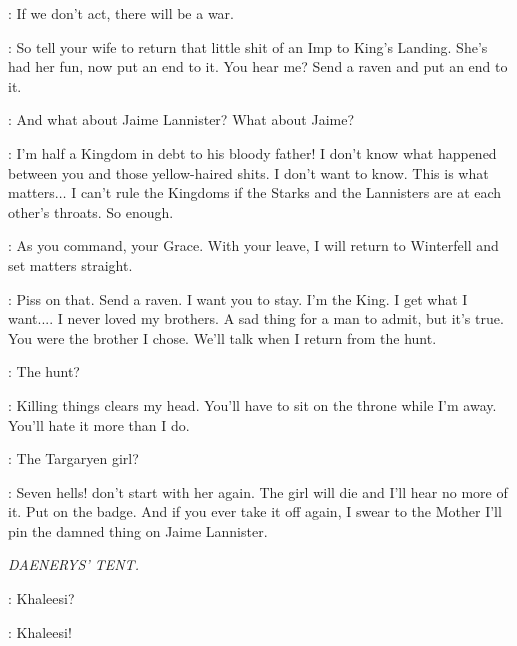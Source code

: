 \NED:  If we don't act, there will be a war. 

\ROBERT:  So tell your wife to return that little shit of an Imp to King's Landing. She's had her fun, now put an end to it. You hear me? Send a raven and put an end to it. 

\NED:  And what about Jaime Lannister?  What about Jaime? 

\ROBERT:  I'm half a Kingdom in debt to his bloody father! I don't know what happened between you and those yellow-haired shits. I don't want to know. This is what matters$\ldots$ I can't rule the Kingdoms if the Starks and the Lannisters are at each other's throats. So enough. 

\NED:  As you command, your Grace. With your leave, I will return to Winterfell and set matters straight. 

\ROBERT: Piss on that. Send a raven. I want you to stay. I'm the King. I get what I want.... I never loved my brothers. A sad thing for a man to admit, but it's true. You were the brother I chose.  We'll talk when I return from the hunt. 

\NED: The hunt?

\ROBERT:  Killing things clears my head. You'll have to sit on the throne while I'm away. You'll hate it more than I do. 

\NED:  The Targaryen girl?

\ROBERT: Seven hells! don't start with her again. The girl will die and I'll hear no more of it. Put on the badge. And if you ever take it off again, I swear to the Mother I'll pin the damned thing on Jaime Lannister. 


\scene

\textit{DAENERYS' TENT.} 


\IRRI:  Khaleesi? 


\IRRI: Khaleesi! 


